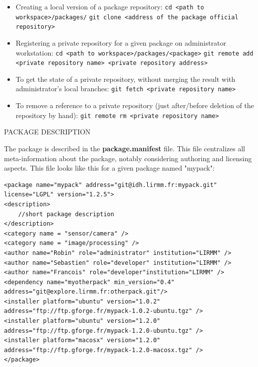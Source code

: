\documentclass[12pt,a4paper]{article}
\begin{document}
\begin{itemize}
\item Creating a local version of a package repository:
\linebreak \texttt{cd <path to workspace>/packages/}
\linebreak \texttt{git clone <address of the package official repository>}
\item Registering a private repository for a given package on administrator workstation:
\linebreak \texttt{cd <path to workspace>/packages/<package>}
\linebreak \texttt{git remote add <private repository name> <private repository address>}
\item To get the state of a private repository, without merging the result with administrator's local branches:
\linebreak \texttt{git fetch <private repository name>}
\item To remove a reference to a private repository (just after/before deletion of the repository by hand):
\linebreak \texttt{git remote rm <private repository name>}
\end{itemize} 

PACKAGE DESCRIPTION

The package is described in the \textbf{package.manifest} file. This file centralizes all meta-information about the package, notably considering authoring and licensing aspects. This file looks like this for a given package named "mypack":
\begin{verbatim}
<package name="mypack" address="git@idh.lirmm.fr:mypack.git"
license="LGPL" version="1.2.5">
<description>
	//short package description
</description>
<category name = "sensor/camera" />
<category name = "image/processing" />
<author name="Robin" role="administrator" institution="LIRMM" />
<author name="Sebastien" role="developer" institution="LIRMM" />    
<author name="Francois" role="developer"institution="LIRMM" />
<dependency name="myotherpack" min_version="0.4"
address="git@explore.lirmm.fr:otherpack.git"/>
<installer platform="ubuntu" version="1.0.2"
address="ftp://ftp.gforge.fr/mypack-1.0.2-ubuntu.tgz" />
<installer platform="ubuntu" version="1.2.0" 
address="ftp://ftp.gforge.fr/mypack-1.2.0-ubuntu.tgz" />
<installer platform="macosx" version="1.2.0" 
address="ftp://ftp.gforge.fr/mypack-1.2.0-macosx.tgz" />
</package>
\end{verbatim}
\end{document}
